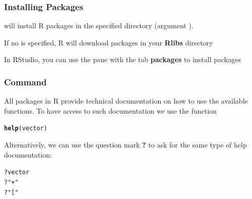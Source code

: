 \documentclass[12pt]{beamer}\usepackage[]{graphicx}\usepackage[]{color}
\makeatletter
\newcommand{\hlstr}[1]{\textcolor[rgb]{0.192,0.494,0.8}{#1}}%
\newcommand{\hlopt}[1]{\textcolor[rgb]{0,0,0}{#1}}%
\newcommand{\hlstd}[1]{\textcolor[rgb]{0.345,0.345,0.345}{#1}}%
\newcommand{\hlkwd}[1]{\textcolor[rgb]{0.737,0.353,0.396}{\textbf{#1}}}%
\newenvironment{kframe}{%
 \def\at@end@of@kframe{}%
 \ifinner\ifhmode%
  \def\at@end@of@kframe{\end{minipage}}%
  \begin{minipage}{\columnwidth}%
 \fi\fi%
 \def\FrameCommand##1{\hskip\@totalleftmargin \hskip-\fboxsep
 \colorbox{shadecolor}{##1}\hskip-\fboxsep
     \hskip-\linewidth \hskip-\@totalleftmargin \hskip\columnwidth}%
 \MakeFramed {\advance\hsize-\width
   \@totalleftmargin\z@ \linewidth\hsize
   \@setminipage}}%
 {\par\unskip\endMakeFramed%
 \at@end@of@kframe}
\newenvironment{knitrout}{}{} %
\makeatother
\begin{document}

\begin{frame}[fragile]
\frametitle{Installing Packages}

\bbi
  \item {} will install R packages in the specified  directory (argument ).
  \item If no  is specified, R will download packages in your \textbf{Rlibs} directory
  \item In RStudio, you can use the pane with the tab \textbf{packages} to install packages 
\ei

\end{frame}


\begin{frame}
\begin{center}
\Huge{}
\end{center}
\end{frame}


\begin{frame}[fragile]
\frametitle{Command }

All packages in R provide technical documentation on how to use the available functions. To have access to such documentation we use the function {\hilit {}}
\begin{knitrout}\footnotesize
{}\color{fgcolor}\begin{kframe}
\begin{alltt}
\hlkwd{help}\hlstd{(vector)}
\end{alltt}
\end{kframe}
\end{knitrout}

Alternatively, we can use the question mark {\hilit \textbf{?}} to ask for the same type of help documentation:
\begin{knitrout}\footnotesize
{}\color{fgcolor}\begin{kframe}
\begin{alltt}
\hlopt{?}\hlstd{vector}
\hlopt{?}\hlstr{"+"}
\hlopt{?}\hlstr{"["}
\end{alltt}
\end{kframe}
\end{knitrout}

\end{frame}
\end{document}
